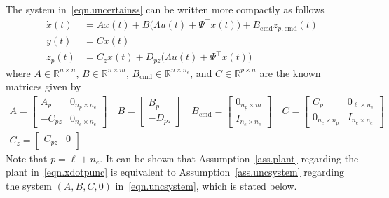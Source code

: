 The system in\ \eqref{eqn.uncertainss} can be written more compactly as follows
\begin{equation}
  \label{eqn.uncsystem}
  \begin{split}
    \dot{x}(t) &= Ax(t)+B\bigr(\Lambda u(t)+\Psi^{\top}x(t)\bigr)+B_{\text{cmd}}z_{p,\text{cmd}}(t) \\
    y(t) &= Cx(t) \\
    z_{p}(t) &= C_{z}x(t) + D_{pz}\bigr(\Lambda u(t)+\Psi^{\top}x(t)\bigr)
  \end{split}
\end{equation}
where $A\in\mathbb{R}^{n\times n}$, $B\in\mathbb{R}^{n\times m}$, $B_{\text{cmd}}\in\mathbb{R}^{n\times n_{e}}$, and $C\in\mathbb{R}^{p\times n}$ are the known matrices given by
\begin{equation*}
  \begin{gathered}
    A=
    \begin{bmatrix}
      A_{p} & 0_{n_{p}\times n_{e}} \\
      -C_{pz} & 0_{n_{e}\times n_{e}}
    \end{bmatrix} \quad
    B=
    \begin{bmatrix}
      B_{p} \\
      -D_{pz}
    \end{bmatrix}
    \quad
    B_{\text{cmd}}=
    \begin{bmatrix}
      0_{n_{p}\times m} \\
      I_{n_{e}\times n_{e}}
    \end{bmatrix}
    \quad
    C=
    \begin{bmatrix}
      C_{p} & 0_{\ell\times n_{e}} \\
      0_{n_{e}\times n_{p}} & I_{n_{e}\times n_{e}}
    \end{bmatrix} \\
    C_{z} =
    \begin{bmatrix}
      C_{pz} & 0
    \end{bmatrix}
  \end{gathered}
\end{equation*}
Note that $p=\ell+n_{e}$.
It can be shown that Assumption~\ref{ass.plant} regarding the plant in\ \eqref{eqn.xdotpunc} is equivalent to Assumption~\ref{ass.uncsystem} regarding the system $(A,B,C,0)$ in\ \eqref{eqn.uncsystem}, which is stated below.

